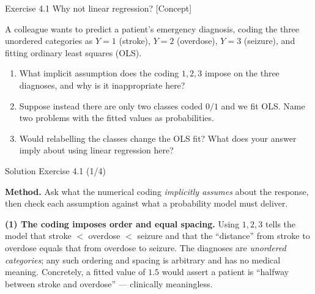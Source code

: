 \documentclass[aspectratio=169,11pt]{beamer}
\begin{document}

\begin{frame}{Exercise 4.1 \textemdash{} Why not linear regression? [Concept]}
\begin{exercise}
A colleague wants to predict a patient's emergency diagnosis, coding the
three unordered categories as $Y=1$ (stroke), $Y=2$ (overdose),
$Y=3$ (seizure), and fitting ordinary least squares (OLS).
\begin{enumerate}
  \item What implicit assumption does the coding $1,2,3$ impose on the
        three diagnoses, and why is it inappropriate here?
  \item Suppose instead there are only two classes coded $0/1$ and we fit
        OLS. Name two problems with the fitted values as probabilities.
  \item Would relabelling the classes change the OLS fit? What does your
        answer imply about using linear regression here?
\end{enumerate}
\end{exercise}
\end{frame}

\begin{frame}{Solution \textemdash{} Exercise 4.1 (1/4)}
\begin{solutionbox}
\textbf{Method.} Ask what the numerical coding \emph{implicitly assumes}
about the response, then check each assumption against what a
probability model must deliver.

\vspace{1mm}
\textbf{(1) The coding imposes order and equal spacing.}
Using $1,2,3$ tells the model that stroke $<$ overdose $<$ seizure and
that the ``distance'' from stroke to overdose equals that from overdose
to seizure. The diagnoses are \emph{unordered categories}; any such
ordering and spacing is arbitrary and has no medical meaning.
Concretely, a fitted value of $1.5$ would assert a patient is
``halfway between stroke and overdose'' --- clinically meaningless.

\vspace{1mm}
\end{solutionbox}
\end{frame}
\end{document}

